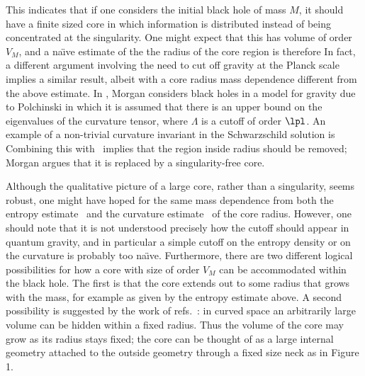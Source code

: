 This indicates that if one considers the initial black hole of mass $M$,
it  should have a finite sized core
in which information is distributed instead of being concentrated at
the singularity.  One might expect that this has volume of order $V_M$,
and a  na\"\i ve estimate of the the radius of the core region is therefore
%
\eqn{}
%
In fact, a different argument
involving the need to cut off gravity at the Planck scale implies a
similar
result, albeit with a core radius mass dependence different
from the above estimate.
In , Morgan considers black holes in a
model for gravity due to Polchinski {\Polc} in which it is
assumed that there is an upper bound on the eigenvalues of the
curvature tensor,
%
\eqn{}
%
where $\Lambda$ is a cutoff of order $\lpl$.
An example of a non-trivial curvature invariant in the Schwarzschild
solution is
%
\eqn{}
%
Combining this with \curvbd\ implies that the region inside
radius
%
\eqn{}
%
should be removed;  Morgan argues that it is
replaced by a singularity-free core.

Although the qualitative picture  of a large core, rather than a
singularity, seems robust, one might have hoped for the same mass dependence
from both the entropy estimate \ebound\ and the curvature estimate \cbound\
of the core
radius.  However, one
should note that it is not understood precisely how the cutoff should
appear in quantum gravity, and in particular a simple cutoff on
the entropy density or on the curvature is probably too na\"\i ve.
Furthermore, there are two different logical possibilities for how a core
with size of order $V_M$ can be accommodated within the black hole.  The first
is that the core extends out to some radius that grows with the mass, for
example as given by the entropy estimate above. A second possibility
is suggested by the work of refs.~\refs{\BDDO,\DXBH}:
in curved space an arbitrarily large volume can be hidden within a fixed
radius.  Thus the volume of the core may grow as its radius stays fixed;
the core
can be thought of as a large internal geometry
attached to the outside geometry through a
fixed size neck as in Figure 1.

